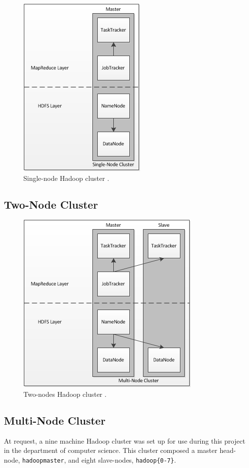 \begin{figure}[htbp]
  \centering
    \includegraphics{./img/singlenode}
  \caption{Single-node Hadoop cluster \cite{nollsingle}.}
  \label{fig:singlenode}
\end{figure}

\subsection{Two-Node Cluster}
\cite{nollmulti}

\begin{figure}[htbp]
  \centering
    \includegraphics{./img/twonode}
  \caption{Two-nodes Hadoop cluster \cite{nollmulti}.}
  \label{fig:twonode}
\end{figure}

\subsection{Multi-Node Cluster}
At request, a nine machine Hadoop cluster was set up for use during this project in the department of computer science. This cluster composed a master head-node, {\tt hadoopmaster}, and eight slave-nodes, {\tt hadoop\{0-7\}}. 

